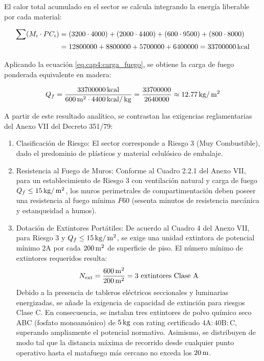 El calor total acumulado en el sector se calcula integrando la energía liberable por cada material:

\begin{align}
\sum (M_i \cdot PC_i) &= (3200 \cdot 4000) + (2000 \cdot 4400) + (600 \cdot 9500) + (800 \cdot 8000) \notag \\
&= 12800000 + 8800000 + 5700000 + 6400000 = 33700000\,\mathrm{kcal}
\end{align}

Aplicando la ecuación \ref{eq.cap4:carga_fuego}, se obtiene la carga de fuego ponderada equivalente en madera:

\begin{equation}
Q_f = \frac{33700000\,\mathrm{kcal}}{600\,\mathrm{m}^2 \cdot 4400\,\mathrm{kcal}/\,\mathrm{kg}} = \frac{33700000}{2640000} \approx 12.77\,\mathrm{kg}/\,\mathrm{m}^2
\end{equation}

A partir de este resultado analítico, se contrastan las exigencias reglamentarias del Anexo VII del Decreto 351/79:

\begin{enumerate}
    \item Clasificación de Riesgo: El sector corresponde a Riesgo 3 (Muy Combustible), dado el predominio de plásticos
          y material celulósico de embalaje.
    \item Resistencia al Fuego de Muros: Conforme al Cuadro 2.2.1 del Anexo VII, para un establecimiento de Riesgo 3 con
          ventilación natural y carga de fuego $Q_f \le 15\,\mathrm{kg}/\,\mathrm{m}^2$, los muros perimetrales de compartimentación deben
          poseer una resistencia al fuego mínima $F60$ (sesenta minutos de resistencia mecánica y estanqueidad a humos).
    \item Dotación de Extintores Portátiles: De acuerdo al Cuadro 4 del Anexo VII, para Riesgo 3 y $Q_f \le 15\,\mathrm{kg}/\,\mathrm{m}^2$,
          se exige una unidad extintora de potencial mínimo $2\mathrm{A}$ por cada $200\,\mathrm{m}^2$ de superficie de piso. El número
          mínimo de extintores requeridos resulta:
          \begin{equation}
          N_{\text{ext}} = \frac{600\,\mathrm{m}^2}{200\,\mathrm{m}^2} = 3 \text{ extintores Clase A}
          \end{equation}
          Debido a la presencia de tableros eléctricos seccionales y luminarias energizadas, se añade la exigencia de
          capacidad de extinción para riesgos Clase C. En consecuencia, se instalan tres extintores de polvo químico seco
          ABC (fosfato monoamónico) de $5\,\mathrm{kg}$ con rating certificado $4\mathrm{A}:40\mathrm{B:C}$, superando ampliamente el
          potencial normativo. Asimismo, se distribuyen de modo tal que la distancia máxima de recorrido desde cualquier
          punto operativo hasta el matafuego más cercano no exceda los $20\,\mathrm{m}$.
\end{enumerate}

